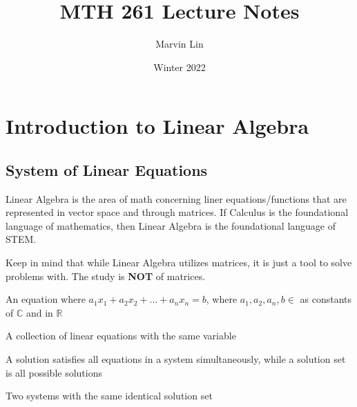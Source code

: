 \documentclass{report}
\title{MTH 261 Lecture Notes}
\author{Marvin Lin}
\date{Winter 2022}
\begin{document}
\maketitle

\tableofcontents

\chapter{Introduction to Linear Algebra}

\section{System of Linear Equations}

Linear Algebra is the area of math concerning liner equations/functions that are represented in vector space and through matrices. If Calculus is the foundational language of mathematics, then Linear Algebra is the foundational language of STEM.

\begin{remark}
Keep in mind that while Linear Algebra utilizes matrices, it is just a tool to solve problems with. The study is \textbf{NOT} of matrices.
\end{remark}

\begin{definition}
An equation where $a_1x_1+a_2x_2+\dots+a_nx_n=b$, where $a_1,a_2,a_n, b \in$ as constants of $\mathbb{C}$ and in $\mathbb{R}$
\end{definition}

\begin{definition}
A collection of linear equations with the same variable
\end{definition}

\begin{definition}
A solution satisfies all equations in a system simultaneously, while a solution set is all possible solutions
\end{definition}

\begin{definition}
Two systems with the same identical solution set
\end{definition}
\end{document}
